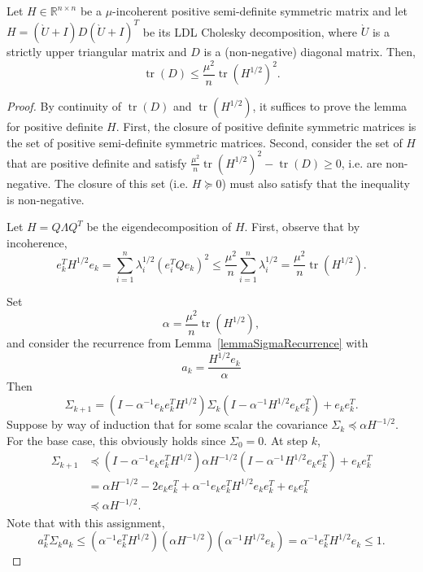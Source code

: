 \begin{lemmarep}\label{lemDincoherentBd}
Let $H \in \mathbb{R}^{n \times n}$ be a $\mu$-incoherent positive semi-definite symmetric matrix and let $H = (\grave U + I) D (\grave U + I)^T$ be its LDL Cholesky decomposition, where $\grave U$ is a strictly upper triangular matrix and $D$ is a (non-negative) diagonal matrix. Then,
\[
    \operatorname{tr}\left(D\right) \le \frac{\mu^2}{n} \operatorname{tr}\left( H^{1/2} \right)^2.
\]
\end{lemmarep}

\begin{proof}
By continuity of $\operatorname{tr}\left(D\right)$ and $\operatorname{tr}\left(H^{1/2}\right)$, it suffices to prove the lemma for positive definite $H$. First, the closure of positive definite symmetric matrices is the set of positive semi-definite symmetric matrices. Second, consider the set of $H$ that are positive definite and satisfy $\frac{\mu^2}{n} \operatorname{tr}\left(H^{1/2}\right)^2 - \operatorname{tr}\left(D\right) \geq 0$, i.e. are non-negative. The closure of this set (i.e. $H \succeq 0$) must also satisfy that the inequality is non-negative.

Let $H = Q \Lambda Q^T$ be the eigendecomposition of $H$. First, observe that by incoherence,
\[
    e_k^T H^{1/2} e_k =
    \sum_{i=1}^n \lambda_i^{1/2} (e_i^T Q e_k)^2
    \le
    \frac{\mu^2}{n} \sum_{i=1}^n \lambda_i^{1/2}
    =
    \frac{\mu^2}{n} \operatorname{tr}\left(H^{1/2}\right).
\]

Set
\[
    \alpha = \frac{\mu^2}{n} \operatorname{tr}\left(H^{1/2}\right),
\]
and consider the recurrence from Lemma~\ref{lemmaSigmaRecurrence} with
\[
    a_k = \frac{H^{1/2} e_k}{\alpha}
\]
Then
\[
    \Sigma_{k+1} = \left(I - \alpha^{-1} e_k e_k^T H^{1/2} \right) \Sigma_k \left(I - \alpha^{-1}H^{1/2} e_k e_k^T \right) + e_k e_k^T.
\]
Suppose by way of induction that for some scalar the covariance $\Sigma_k \preceq \alpha H^{-1/2}$. For the base case, this obviously holds since $\Sigma_0 = 0$. At step $k$,
\begin{align*}
    \Sigma_{k+1} 
    &\preceq
     \left(I - \alpha^{-1} e_k e_k^T H^{1/2} \right) \alpha H^{-1/2} \left(I - \alpha^{-1}H^{1/2} e_k e_k^T \right) + e_k e_k^T
    \\&=
    \alpha H^{-1/2} - 2 e_k e_k^T +
    \alpha^{-1} e_k e_k^T H^{1/2} e_k e_k^T + e_k e_k^T
    \\&\preceq
    \alpha H^{-1/2}.
\end{align*}
Note that with this assignment,
\[
    a_k^T \Sigma_k a_k
    \le
    (\alpha^{-1} e_k^T H^{1/2}) (\alpha H^{-1/2}) (\alpha^{-1} H^{1/2} e_k) =
    \alpha^{-1} e_k^T H^{1/2} e_k
    \le
    1.
\]


\end{proof}
